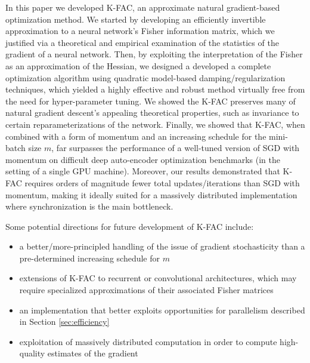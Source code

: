\documentclass[12pt]{article}
\newcommand{\acronym}{K-FAC}
\begin{document}
In this paper we developed \acronym{}, an approximate natural gradient-based optimization method.  We started by developing an efficiently invertible approximation to a neural network's Fisher information matrix, which we justified via a theoretical and empirical examination of the statistics of the gradient of a neural network.  Then, by exploiting the interpretation of the Fisher as an approximation of the Hessian, we designed a developed a complete optimization algorithm using quadratic model-based damping/regularization techniques, which yielded a highly effective and robust method virtually free from the need for hyper-parameter tuning.  We showed the \acronym{} preserves many of natural gradient descent's appealing theoretical properties, such as invariance to certain reparameterizations of the network.  Finally, we showed that \acronym{}, when combined with a form of momentum and an increasing schedule for the mini-batch size $m$, far surpasses the performance of a well-tuned version of SGD with momentum on difficult deep auto-encoder optimization benchmarks (in the setting of a single GPU machine).  Moreover, our results demonstrated that \acronym{} requires orders of magnitude fewer total updates/iterations than SGD with momentum, making it ideally suited for a massively distributed implementation where synchronization is the main bottleneck.

Some potential directions for future development of \acronym{} include:
\begin{itemize}
\item a better/more-principled handling of the issue of gradient stochasticity than a pre-determined increasing schedule for $m$
\item extensions of \acronym{} to recurrent or convolutional architectures, which may require specialized approximations of their associated Fisher matrices
\item an implementation that better exploits opportunities for parallelism described in Section \ref{sec:efficiency}
\item exploitation of massively distributed computation in order to compute high-quality estimates of the gradient%
\end{itemize}



\end{document}
